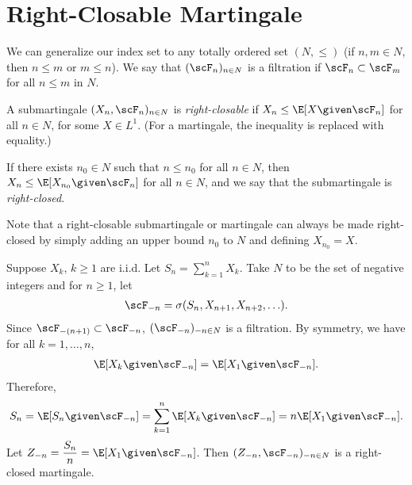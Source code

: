 \documentclass[../aipt.tex]{subfiles}
\begin{document}


\section{Right-Closable Martingale}

We can generalize our index set to any totally ordered set $(N, \leq)$ (if $n,m\in N$, then $n \leq m$ or $m \leq n$). We say that $(\scF_n)_{n\in N}$ is a filtration if $\scF_n \subset \scF_m$ for all $n \leq m$ in $N$. 

\begin{Definition}
A submartingale $(X_n,\scF_n)_{n\in N}$ is \emph{right-closable} if $X_n \leq \E[X \given \scF_n]$ for all $n\in N$, for some $X \in L^1$. (For a martingale, the inequality is replaced with equality.)

If there exists $n_0\in N$ such that $n\leq n_0$ for all $n\in N$, then $X_n \leq \E[X_{n_0} \given \scF_n]$ for all $n\in N$, and we say that the submartingale is \emph{right-closed}.
\end{Definition}
Note that a right-closable submartingale or martingale can always be made right-closed by simply adding an upper bound $n_0$ to $N$ and defining $X_{n_0} = X$.

\begin{Example}\label{wk15:reverse_martingale}
Suppose $X_k$, $k\geq1$ are i.i.d. Let $S_n = \sum_{k=1}^n X_k$. Take $N$ to be the set of negative integers and for $n\geq1$, let
\begin{align*}
\scF_{-n} = \sigma(S_n, X_{n+1}, X_{n+2}, \ldots).
\end{align*}
Since $\scF_{-(n+1)} \subset \scF_{-n}$, $(\scF_{-n})_{-n\in N}$ is a filtration. By symmetry, we have for all $k=1,\ldots,n$,
\begin{align*}
\E[X_k \given \scF_{-n}] = \E[X_1 \given \scF_{-n}].
\end{align*}
Therefore,
\begin{align*}
S_n = \E[S_n \given \scF_{-n}] = \sum_{k=1}^n \E[X_k \given \scF_{-n}] = n \E[X_1 \given \scF_{-n}].
\end{align*}
Let $Z_{-n}= \dfrac{S_n}{n} = \E[X_1 \given \scF_{-n}]$. Then $(Z_{-n}, \scF_{-n})_{-n\in N}$ is a right-closed martingale.
\end{Example}
\end{document}
